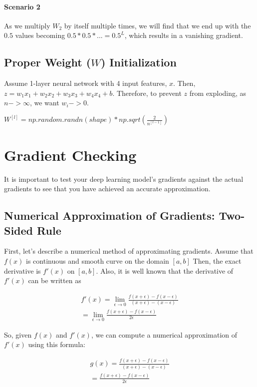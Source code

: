 \documentclass{article}
\begin{document}
\paragraph{Scenario 2}

As we multiply $W_2$ by itself multiple times, we will find that we end up with the $0.5$ values becoming $0.5 * 0.5 * ... = 0.5^L$, which results in a vanishing gradient.

\subsection{Proper Weight ($W$) Initialization}

Assume 1-layer neural network with 4 input features, $x$.  Then, $z = w_1 x_1 + w_2 x_2 + w_3 x_3 + w_4 x_4 + b$.  Therefore, to prevent $z$ from exploding, as $n -> \infty$, we want $w_i -> 0$.

$W^{[l]} = np.random.randn(shape) * np.sqrt(\frac{2}{n^{[l-1]}})$

\section{Gradient Checking}

It is important to test your deep learning model's gradients against the actual gradients to see that you have achieved an accurate approximation.

\subsection{Numerical Approximation of Gradients: Two-Sided Rule}

First, let's describe a numerical method of approximating gradients.  Assume that $f(x)$ is continuous and smooth curve on the domain $[a,b]$  Then, the exact derivative is $f'(x)$ on $[a,b]$.  Also, it is well known that the derivative of $f'(x)$ can be written as

\begin{align}
f'(x) = \lim_{\epsilon \to 0} \frac{f(x + \epsilon) - f(x - \epsilon)}{(x + \epsilon) - (x - \epsilon)} \\
= \lim_{\epsilon \to 0} \frac{f(x + \epsilon) - f(x - \epsilon)}{2 \epsilon}
\end{align}

So, given $f(x)$ and $f'(x)$, we can compute a numerical approximation of $f'(x)$ using this formula:

\begin{align}
g(x) = \frac{f(x + \epsilon) - f(x - \epsilon)}{(x + \epsilon) - (x - \epsilon)} \\
= \frac{f(x + \epsilon) - f(x - \epsilon)}{2 \epsilon}
\end{align}
\end{document}
